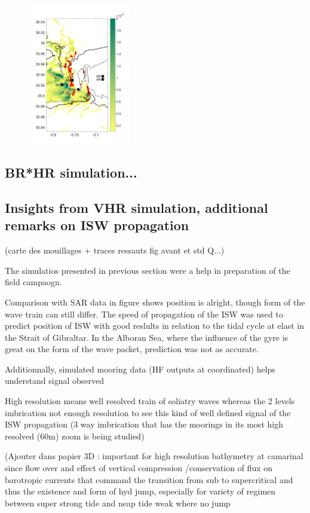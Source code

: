 \begin{figure}[!h]
 \includegraphics[width=0.4\textwidth]{./GBR3D/Fig_Moor.png}
 \caption {   }
\end{figure}


\subsection{BR*HR simulation...}



\subsection{Insights from VHR simulation, additional remarks on ISW propagation}
(carte des mouillages + traces ressauts fig avant et std Q...)

The simulatios presented in previous section were a help in preparation of the field campaogn.

Comparison with SAR data in figure shows position is alright, though form of the wave train can still differ. The speed of propagation of the ISW was used to predict position of ISW with good reslults in relation to the tidal cycle at elast in the Strait of Gibraltar. In the Alboran Sea, where the influence of the gyre is great on the form of the wave packet, prediction was not as accurate. 

Additionnally, simulated mooring data (HF outputs at coordinated) helps understand signal observed

High resolution means well resolved train of soliatry waves whereas the 2 levels imbrication not enough resolution to see this kind of well defined signal of the ISW propagation (3 way imbrication that has the moorings in its most high resolved (60m) zoom is being studied)

(Ajouter dans papier 3D : important for high resolution bathymetry at camarinal since flow over and effect of vertical compression /conservation of flux on barotropic currents that command the transition from sub to supercritical and thus the existence and form of hyd jump, especially for variety of regimen between super strong tide and neap tide weak where no jump



